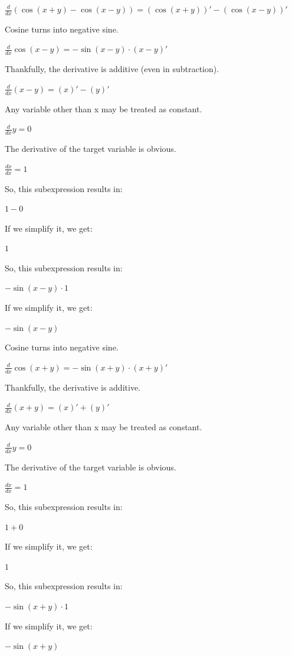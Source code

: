 \documentclass[12pt]{article}
\begin{document}
\begin{fleqn}[\parindent]
$ \frac{d}{dx} (\cos ( x  +  y ) - \cos ( x  -  y )) = (\cos ( x  +  y ))' - (\cos ( x  -  y ))' $\par
Cosine turns into negative sine.\par
$ \frac{d}{dx} \cos ( x  -  y ) = -\sin ( x  -  y ) \cdot ( x  -  y )' $\par
Thankfully, the derivative is additive (even in subtraction).\par
$ \frac{d}{dx} ( x  -  y ) = ( x )' - ( y )' $\par
Any variable other than x may be treated as constant.\par
$ \frac{d}{dx} y = 0 $\par
The derivative of the target variable is obvious.\par
$ \frac{dx}{dx} = 1 $\par
So, this subexpression results in:\par
$  1  -  0  $\par
If we simplify it, we get:\par
$  1  $\par
So, this subexpression results in:\par
$ - \sin ( x  -  y ) \cdot  1  $\par
If we simplify it, we get:\par
$ - \sin ( x  -  y ) $\par
Cosine turns into negative sine.\par
$ \frac{d}{dx} \cos ( x  +  y ) = -\sin ( x  +  y ) \cdot ( x  +  y )' $\par
Thankfully, the derivative is additive.\par
$ \frac{d}{dx} ( x  +  y ) = ( x )' + ( y )' $\par
Any variable other than x may be treated as constant.\par
$ \frac{d}{dx} y = 0 $\par
The derivative of the target variable is obvious.\par
$ \frac{dx}{dx} = 1 $\par
So, this subexpression results in:\par
$  1  +  0  $\par
If we simplify it, we get:\par
$  1  $\par
So, this subexpression results in:\par
$ - \sin ( x  +  y ) \cdot  1  $\par
If we simplify it, we get:\par
$ - \sin ( x  +  y ) $\par

\end{fleqn}
\end{document}

